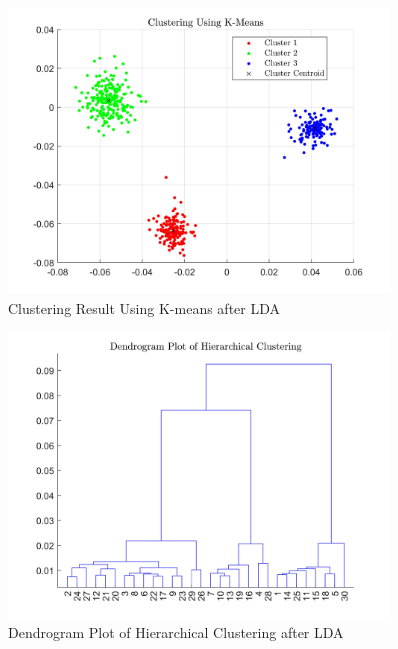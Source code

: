 \documentclass[a4paper,12pt]{article} %
\begin{document}
\begin{figure}[!htbp]
	\centering
	\includegraphics[width=0.9\textwidth]{KMEANS2.jpg}
	\caption{Clustering Result Using K-means after LDA}
	\label{fig:7}
\end{figure}

\begin{figure}[!htbp]
	\centering
	\includegraphics[width=0.9\textwidth]{DEN2.jpg}
	\caption{Dendrogram Plot of Hierarchical Clustering after LDA}
	\label{fig:8}
\end{figure}
\end{document}
